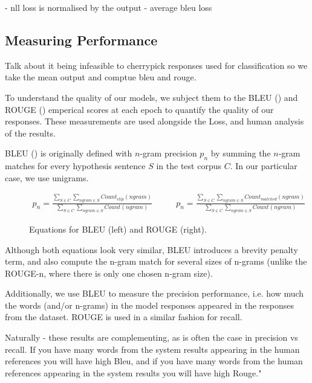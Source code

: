 \documentclass[12pt,twoside]{report}
\begin{document}
- nll loss is normalised by the output
- average bleu loss 

\subsection{Measuring Performance}

Talk about it being infeasible to cherrypick responses used for classification so we take the mean output and comptue bleu and rouge.

To understand the quality of our models, we subject them to the BLEU (\cite{papineni_bleu:_2001}) and ROUGE (\cite{lin_rouge:_2004}) emperical scores at each epoch to quantify the quality of our responses. These measurements are used alongside the Loss, and human analysis of the results.

BLEU (\cite{papineni_bleu:_2001}) is originally defined with $n$-gram precision $p_n$ by summing the $n$-gram matches for every hypothesis sentence $S$ in the test corpus $C$. In our particular case, we use unigrams.

\begin{figure}[!ht]
	\begin{equation}
		\begin{split}
			p_n = \frac
			{\sum_{S\in C} \sum_{ngram\in S} Count_{clip}(ngram)}
			{\sum_{S\in C} \sum_{ngram\in S} Count(ngram)}
		\end{split}
		\quad\quad
		\begin{split}
			p_n = \frac
			{\sum_{S\in C} \sum_{ngram\in S} Count_{matched}(ngram)}
			{\sum_{S\in C} \sum_{ngram\in S} Count(ngram)}
		\end{split}
	\end{equation}
	\caption{Equations for BLEU (left) and ROUGE  (right).}
	\end{figure}


Although both equations look very similar,  BLEU introduces a brevity penalty term, and also compute the n-gram match for several sizes of n-grams (unlike the ROUGE-n, where there is only one chosen n-gram size). 

Additionally, we use BLEU to measure the precision performance, i.e. how much the words (and/or n-grams) in the model responses appeared in the responses from the dataset. ROUGE is used in a similar fashion for recall.

Naturally - these results are complementing, as is often the case in precision vs recall. If you have many words from the system results appearing in the human references you will have high Bleu, and if you have many words from the human references appearing in the system results you will have high Rouge."
\end{document}
